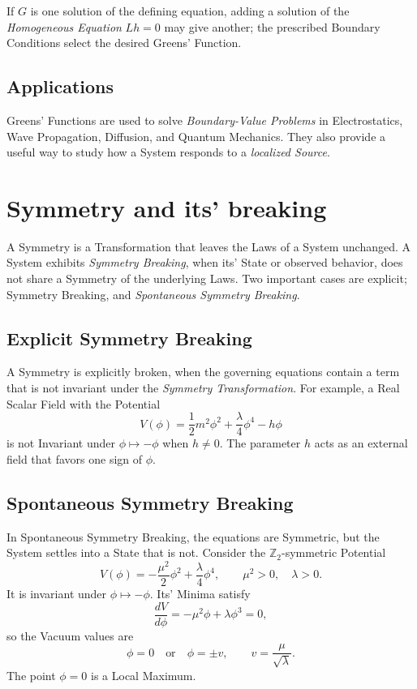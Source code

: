 \documentclass[a4paper, 10pt, onepage]{elegantbook}
\begin{document}
{If \(G\) is one solution of the defining equation, adding a solution of the \emph{Homogeneous Equation} \(Lh=0\) may 
give another; the prescribed
Boundary Conditions select the desired Greens' Function.

\subsection{Applications}

Greens' Functions are used to solve \emph{Boundary-Value Problems} in Electrostatics, Wave Propagation, Diffusion, and 
Quantum Mechanics. They also provide a useful way to study how a System responds to a \emph{localized Source}.



\section{Symmetry and its' breaking}

A Symmetry is a Transformation that leaves the Laws of a System unchanged. A System exhibits \emph{Symmetry Breaking}, 
when its' State or observed behavior, does not share a Symmetry of the underlying Laws. Two important cases are 
explicit; Symmetry Breaking, and \emph{Spontaneous Symmetry Breaking}.

\subsection{Explicit Symmetry Breaking}

A Symmetry is explicitly broken, when the governing equations contain a term that is not invariant under the 
\emph{Symmetry Transformation}. For example, a Real Scalar Field with the Potential
\[
V(\phi)=\frac{1}{2}m^2\phi^2+\frac{\lambda}{4}\phi^4-h\phi
\]
is not Invariant under \(\phi\mapsto-\phi\) when \(h\ne 0\). The parameter \(h\) acts as an external field that favors 
one sign of
\(\phi\).

\subsection{Spontaneous Symmetry Breaking}

In Spontaneous Symmetry Breaking, the equations are Symmetric, but the System settles into a State that is not. 
Consider the
\(\mathbb{Z}_2\)-symmetric Potential
\[
V(\phi)=-\frac{\mu^2}{2}\phi^2+\frac{\lambda}{4}\phi^4,
\qquad \mu^2>0,\quad \lambda>0.
\]
It is invariant under \(\phi\mapsto-\phi\). Its' Minima satisfy
\[
\frac{dV}{d\phi}=-\mu^2\phi+\lambda\phi^3=0,
\]
so the Vacuum values are
\[
\phi=0
\quad\text{or}\quad
\phi=\pm v,
\qquad
v=\frac{\mu}{\sqrt{\lambda}}.
\]
The point \(\phi=0\) is a Local Maximum.

}
\end{document}
